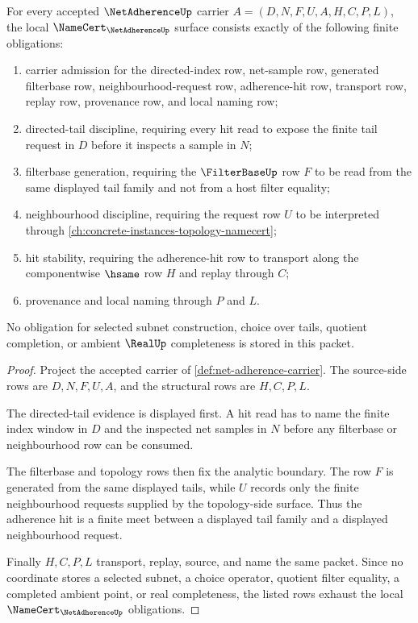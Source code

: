 \begin{theorem}
\label{thm:net-adherence-filterbase-obligations}
For every accepted $\NetAdherenceUp$ carrier $A=(D,N,F,U,A,H,C,P,L)$, the local $\NameCert_{\NetAdherenceUp}$ surface consists exactly of the following finite obligations:
\begin{enumerate}
\item carrier admission for the directed-index row, net-sample row, generated filterbase row, neighbourhood-request row, adherence-hit row, transport row, replay row, provenance row, and local naming row;
\item directed-tail discipline, requiring every hit read to expose the finite tail request in $D$ before it inspects a sample in $N$;
\item filterbase generation, requiring the $\FilterBaseUp$ row $F$ to be read from the same displayed tail family and not from a host filter equality;
\item neighbourhood discipline, requiring the request row $U$ to be interpreted through \autoref{ch:concrete-instances-topology-namecert};
\item hit stability, requiring the adherence-hit row to transport along the componentwise $\hsame$ row $H$ and replay through $C$;
\item provenance and local naming through $P$ and $L$.
\end{enumerate}
No obligation for selected subnet construction, choice over tails, quotient completion, or ambient $\RealUp$ completeness is stored in this packet.
\end{theorem}
\begin{proof}
Project the accepted carrier of \autoref{def:net-adherence-carrier}. The source-side rows are $D,N,F,U,A$, and the structural rows are $H,C,P,L$.

The directed-tail evidence is displayed first. A hit read has to name the finite index window in $D$ and the inspected net samples in $N$ before any filterbase or neighbourhood row can be consumed.

The filterbase and topology rows then fix the analytic boundary. The row $F$ is generated from the same displayed tails, while $U$ records only the finite neighbourhood requests supplied by the topology-side surface. Thus the adherence hit is a finite meet between a displayed tail family and a displayed neighbourhood request.

Finally $H,C,P,L$ transport, replay, source, and name the same packet. Since no coordinate stores a selected subnet, a choice operator, quotient filter equality, a completed ambient point, or real completeness, the listed rows exhaust the local $\NameCert_{\NetAdherenceUp}$ obligations.
\end{proof}

